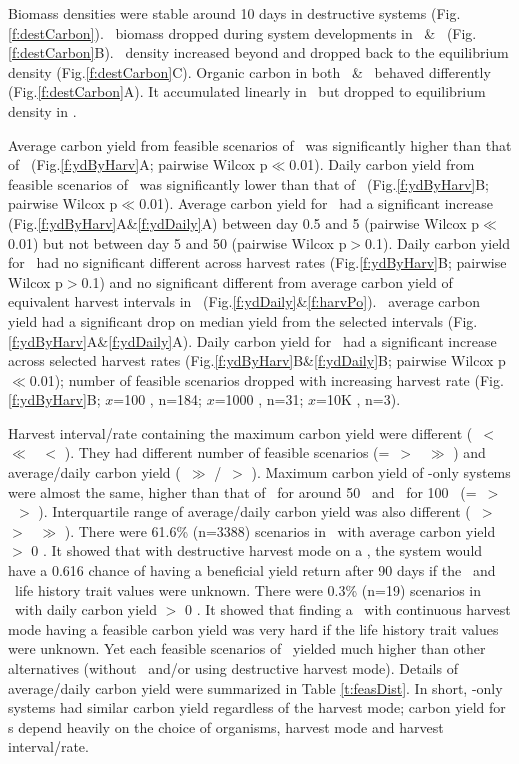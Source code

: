 \documentclass[../thesis.tex]{subfiles} %
\begin{document}
Biomass densities were stable around 10 days in destructive systems (Fig.\ref{f:destCarbon}).  \Phy\ biomass dropped during system developments in \PoN\ \& \PBN\  (Fig.\ref{f:destCarbon}B).  \Bac\ density increased beyond and dropped back to the equilibrium density (Fig.\ref{f:destCarbon}C).  Organic carbon in both \PoN\ \& \PBN\ behaved differently (Fig.\ref{f:destCarbon}A).  It accumulated linearly in \PoN\ but dropped to equilibrium density in \PBH.

Average carbon yield from feasible scenarios of \PoN\ was significantly higher than that of \PBN\ (Fig.\ref{f:ydByHarv}A; pairwise Wilcox p$\ll$0.01).  Daily carbon yield from feasible scenarios of \PoH\ was significantly lower than that of \PBH\ (Fig.\ref{f:ydByHarv}B; pairwise Wilcox p$\ll$0.01).  Average carbon yield for \PoN\ had a significant increase (Fig.\ref{f:ydByHarv}A\&\ref{f:ydDaily}A) between day 0.5 and 5 (pairwise Wilcox p$\ll$0.01) but not between day 5 and 50 (pairwise Wilcox p$>$0.1).  Daily carbon yield for \PoH\ had no significant different across harvest rates (Fig.\ref{f:ydByHarv}B; pairwise Wilcox p$>$0.1) and no significant different from average carbon yield of equivalent harvest intervals in \PoN\ (Fig.\ref{f:ydDaily}\&\ref{f:harvPo}).  \PBN\ average carbon yield had a significant drop on median yield from the selected intervals (Fig.\ref{f:ydByHarv}A\&\ref{f:ydDaily}A).  Daily carbon yield for \PBH\ had a significant increase across selected harvest rates (Fig.\ref{f:ydByHarv}B\&\ref{f:ydDaily}B; pairwise Wilcox p$\ll$0.01); number of feasible scenarios dropped with increasing harvest rate (Fig.\ref{f:ydByHarv}B; $x$=100 \dayU, n=184; $x$=1000 \dayU, n=31; $x$=10K \dayU, n=3).

Harvest interval/rate containing the maximum carbon yield were different (\PBN\ $<$ \PBH\ $\ll$ \PoH\ $<$ \PoN).  They had different number of feasible scenarios (\PoH=\PoN\ $>$ \PBN\ $\gg$ \PBH) and average/daily carbon yield (\PBH\ $\gg$ \PoH/\PoN\ $>$ \PBN).  Maximum carbon yield of \phy-only systems were almost the same, higher than that of \PBH\ for around 50 \dxdt\ and \PBN\ for 100 \dxdt\ (\PoH=\PoN\ $>$ \PBH\ $>$ \PBN).  Interquartile range of average/daily carbon yield was also different (\PBH\ $>$ \PoH\ $>$ \PoN\ $\gg$ \PBN).  There were 61.6\% (n=3388) scenarios in \PBN\ with average carbon yield $>$ 0 \dxdt.  It showed that with destructive harvest mode on a \pbs, the system would have a 0.616 chance of having a beneficial yield return after 90 days if the \phy\ and \bac\ life history trait values were unknown.  There were 0.3\% (n=19) scenarios in \PBH\ with daily carbon yield $>$ 0 \dxdt.  It showed that finding a \pbs\ with continuous harvest mode having a feasible carbon yield was very hard if the life history trait values were unknown.  Yet each feasible scenarios of \PBH\ yielded much higher than other alternatives (without \bac\ and/or using destructive harvest mode).  Details of average/daily carbon yield were summarized in Table \ref{t:feasDist}.  In short, \phy-only systems had similar carbon yield regardless of the harvest mode; carbon yield for \pbs s depend heavily on the choice of organisms, harvest mode and harvest interval/rate.
\end{document}
